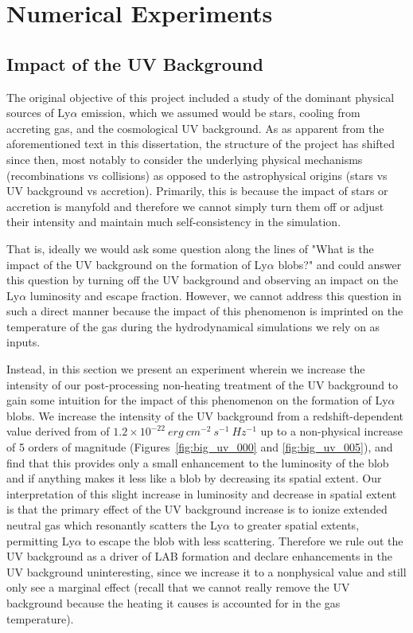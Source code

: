 \chapter{Numerical Experiments}
\label{sec:experiments}

\section{Impact of the UV Background}
The original objective of this project included a study of the dominant physical sources of Ly$\alpha$ emission, which we assumed would be stars, cooling from accreting gas, and the cosmological UV background.
As as apparent from the aforementioned text in this dissertation, the structure of the project has shifted since then, most notably to consider the underlying physical mechanisms (recombinations vs collisions) as opposed to the astrophysical origins (stars vs UV background vs accretion).
Primarily, this is because the impact of stars or accretion is manyfold and therefore we cannot simply turn them off or adjust their intensity and maintain much self-consistency in the simulation.

That is, ideally we would ask some question along the lines of "What is the impact of the UV background on the formation of Ly$\alpha$ blobs?" and could answer this question by turning off the UV background and observing an impact on the Ly$\alpha$ luminosity and escape fraction.
However, we cannot address this question in such a direct manner because the impact of this phenomenon is imprinted on the temperature of the gas during the hydrodynamical simulations we rely on as inputs.

Instead, in this section we present an experiment wherein we increase the intensity of our post-processing non-heating treatment of the UV background to gain some intuition for the impact of this phenomenon on the formation of Ly$\alpha$ blobs.
We increase the intensity of the UV background from a redshift-dependent value derived from \citet{Faucher-Giguere2009} of $1.2\times10^{-22}\ erg\ cm^{-2}\ s^{-1}\ Hz^{-1}$ up to a non-physical increase of 5 orders of magnitude (Figures~\ref{fig:big_uv_000} and \ref{fig:big_uv_005}), and find that this provides only a small enhancement to the luminosity of the blob and if anything makes it less like a blob by decreasing its spatial extent.
Our interpretation of this slight increase in luminosity and decrease in spatial extent is that the primary effect of the UV background increase is to ionize extended neutral gas which resonantly scatters the Ly$\alpha$ to greater spatial extents, permitting Ly$\alpha$ to escape the blob with less scattering.
Therefore we rule out the UV background as a driver of LAB formation and declare enhancements in the UV background uninteresting, since we increase it to a nonphysical value and still only see a marginal effect (recall that we cannot really remove the UV background because the heating it causes is accounted for in the gas temperature).


